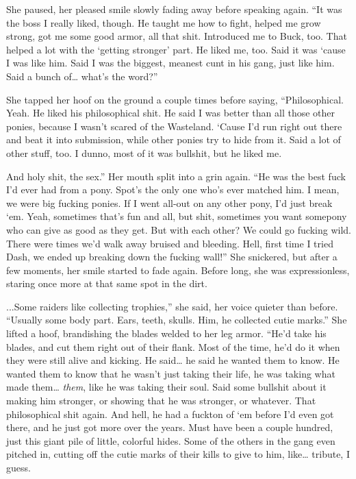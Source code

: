 She paused, her pleased smile slowly fading away before speaking again. “It was the boss I really liked, though. He taught me how to fight, helped me grow strong, got me some good armor, all that shit. Introduced me to Buck, too. That helped a lot with the ‘getting stronger’ part. He liked me, too. Said it was ‘cause I was like him. Said I was the biggest, meanest cunt in his gang, just like him. Said a bunch of… what’s the word?”

She tapped her hoof on the ground a couple times before saying, “Philosophical. Yeah. He liked his philosophical shit. He said I was better than all those other ponies, because I wasn’t scared of the Wasteland. ‘Cause I’d run right out there and beat it into submission, while other ponies try to hide from it. Said a lot of other stuff, too. I dunno, most of it was bullshit, but he liked me.

\leavevmode{}And holy shit, the sex.” Her mouth split into a grin again. “He was the best fuck I’d ever had from a pony. Spot’s the only one who’s ever matched him. I mean, we were big fucking ponies. If I went all-out on any other pony, I’d just break ‘em. Yeah, sometimes that’s fun and all, but shit, sometimes you want somepony who can give as good as they get. But with each other? We could go fucking wild. There were times we’d walk away bruised and bleeding. Hell, first time I tried Dash, we ended up breaking down the fucking wall!” She snickered, but after a few moments, her smile started to fade again. Before long, she was expressionless, staring once more at that same spot in the dirt.

\leavevmode{}...Some raiders like collecting trophies,” she said, her voice quieter than before. “Usually some body part. Ears, teeth, skulls. Him, he collected cutie marks.” She lifted a hoof, brandishing the blades welded to her leg armor. “He’d take his blades, and cut them right out of their flank. Most of the time, he’d do it when they were still alive and kicking. He said… he said he wanted them to know. He wanted them to know that he wasn’t just taking their life, he was taking what made them… \textit{them}, like he was taking their soul. Said some bullshit about it making him stronger, or showing that he was stronger, or whatever. That philosophical shit again. And hell, he had a fuckton of ‘em before I’d even got there, and he just got more over the years. Must have been a couple hundred, just this giant pile of little, colorful hides. Some of the others in the gang even pitched in, cutting off the cutie marks of their kills to give to him, like… tribute, I guess.

